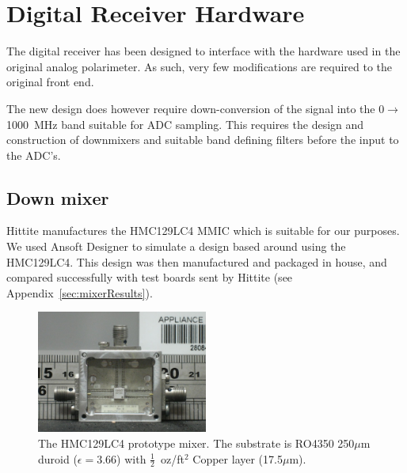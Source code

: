 \section{Digital Receiver Hardware}

The digital receiver has been designed to interface with the hardware used in the original analog polarimeter. As such, very few modifications are required to the original front end.

The new design does however require down-conversion of the signal into the 0$\rightarrow$1000~MHz band suitable for ADC sampling. This requires the design and construction of downmixers and suitable band defining filters before the input to the ADC's.

\subsection{Down mixer}
\label{sec:mixers}
Hittite manufactures the HMC129LC4 MMIC which is suitable for our purposes. We used Ansoft Designer to simulate a design based around using the HMC129LC4. This design was then manufactured and packaged in house, and compared successfully with test boards sent by Hittite (see Appendix~\ref{sec:mixerResults}).

\begin{figure}
 \centering
 \includegraphics[width=0.5\textwidth]{./images/mixers/mixera.jpg}
 \caption{The HMC129LC4 prototype mixer. The substrate is  RO4350 250$\mu$m duroid ($\epsilon=3.66$) with $\frac{1}{2}$~oz/ft$^{2}$ Copper layer (17.5$\mu$m). }
 \label{fig:mixer}
\end{figure}

